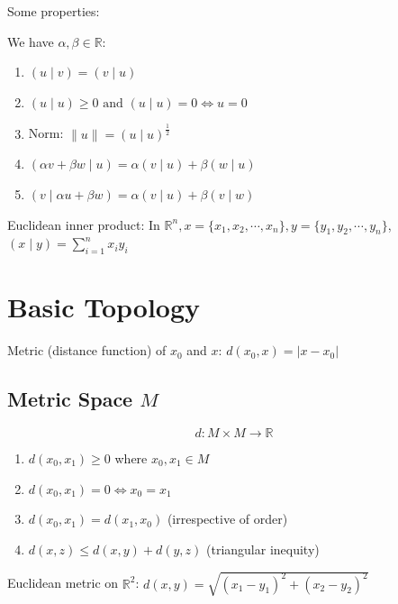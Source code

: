 \documentclass{article}
\newcommand{\norm}[1]{\| #1 \|}
\begin{document}
    Some properties:
    
    We have $\alpha, \beta \in \mathbb{R}$:
    
    \begin{enumerate}
        \item $(u \mid v) = (v \mid u)$
        \item $(u \mid u) \geq 0 \text{ and } (u \mid u) = 0 \iff u = 0$
        \item Norm: $\norm{u} = (u \mid u)^{\frac{1}{2}}$
        \item $(\alpha v + \beta w \mid u) = \alpha (v \mid u) + \beta (w \mid u)$
        \item $(v \mid \alpha u + \beta w) = \alpha (v \mid u) + \beta (v \mid w)$
    \end{enumerate}
    
    Euclidean inner product: In $\mathbb{R}^{n}, x = \{ x_{1}, x_{2}, \cdots, x_{n} \}, y = \{ y_{1}, y_{2}, \cdots, y_{n} \}$, $(x \mid y) = \sum_{i = 1}^{n} x_{i}y_{i}$
    
    \section{Basic Topology}

        Metric (distance function) of $x_{0}$ and $x$: $d(x_{0}, x) = \lvert x - x_{0} \rvert$

    \subsection{Metric Space $M$}

        \begin{displaymath}
        d \colon M \times M \to \mathbb{R}
        \end{displaymath}

        \begin{enumerate}
            \item $d(x_{0}, x_{1}) \geq 0$ where $x_{0}, x_{1} \in M$
            \item $d(x_{0}, x_{1}) = 0 \iff x_{0} = x_{1}$
            \item $d(x_{0}, x_{1}) = d(x_{1}, x_{0})$ (irrespective of order)
            \item $d(x, z) \leq d(x, y) + d(y, z)$ (triangular inequity)
        \end{enumerate}

        Euclidean metric on $\mathbb{R}^{2}$:
        $d(x, y) = \sqrt{(x_{1} - y_{1})^{2} + (x_{2} - y_{2})^{2}}$
\end{document}

